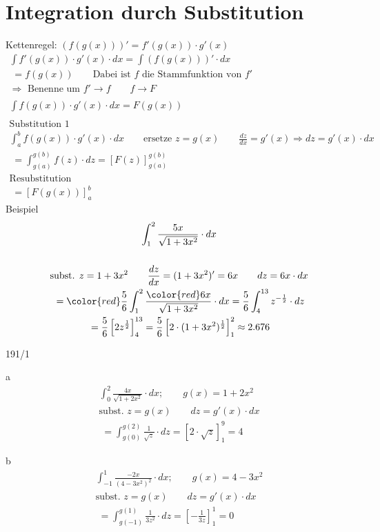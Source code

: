 \section{Integration durch Substitution}
Kettenregel: $(f(g(x)))' = f'(g(x)) \cdot g'(x)$ \\
\begin{gather*}
  \int f'(g(x)) \cdot g'(x) \cdot dx = \int (f(g(x)))' \cdot dx \\
  \;= f(g(x)) \qquad \text{Dabei ist $f$ die Stammfunktion von $f'$} \\
  \Rightarrow \text{ Benenne um $f' \rightarrow f \qquad f \rightarrow F$} \\\\
  \int f(g(x)) \cdot g'(x) \cdot dx = F(g(x)) \\\\
  \text{Substitution 1} \\
  \int_a^b f(g(x)) \cdot g'(x) \cdot dx \qquad \text{ersetze $z = g(x) \qquad \frac{dz}{dx} = g'(x) \Rightarrow dz = g'(x) \cdot dx$} \\
  \;= \int_{g(a)}^{g(b)} f(z) \cdot dz = \left[F(z)\right]_{g(a)}^{g(b)} \\
  \text{Resubstitution} \\
  \;= \left[F(g(x))\right]_a^b
\end{gather*}
Beispiel
\begin{gather*}
  \int_1^2 \frac{5x}{\sqrt{1 + 3x^2}} \cdot dx \\\\
  \text{subst. } z = 1 + 3x^2 \qquad \frac{dz}{dx} = (1 + 3x^2)' = 6x \qquad dz = 6x \cdot dx \\
  \;= {\color{red}\frac{5}{6}} \int_1^2 \frac{{\color{red}6}x}{\sqrt{1 + 3x^2}} \cdot dx = \frac{5}{6} \int_4^{13} z^{-\frac{1}{2}} \cdot dz \\
  \;= \frac{5}{6} \left[2z^\frac{1}{2}\right]_4^{13} = \frac{5}{6} \left[2 \cdot (1 + 3x^2)^\frac{1}{2}\right]_1^2 \approx 2.676
\end{gather*}
\newpage
\begin{exercise}{191/1}
  \item [a]
  \begin{gather*}
    \int_0^2 \frac{4x}{\sqrt{1 + 2x^2}} \cdot dx; \qquad g(x) = 1 + 2x^2 \\
    \text{subst. } z = g(x) \qquad dz = g'(x) \cdot dx \\
    \;= \int_{g(0)}^{g(2)} \frac{1}{\sqrt{z}} \cdot dz = \left[2 \cdot \sqrt{z}\right]_1^9 = 4
  \end{gather*}
  \item [b]
  \begin{gather*}
    \int_{-1}^1 \frac{-2x}{(4 - 3x^2)^2} \cdot dx; \qquad g(x) = 4 - 3x^2 \\
    \text{subst. } z = g(x) \qquad dz = g'(x) \cdot dx \\
    \;= \int_{g(-1)}^{g(1)} \frac{1}{3z^2} \cdot dz = \left[-\frac{1}{3z}\right]_1^1 = 0
  \end{gather*}
\end{exercise}
